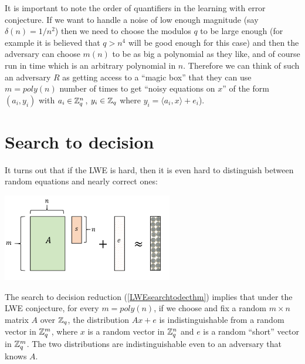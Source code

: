 It is important to note the order of quantifiers in the learning with
error conjecture. If we want to handle a noise of low enough magnitude
(say \(\delta(n) = 1/n^2\)) then we need to choose the modulos \(q\) to
be large enough (for example it is believed that \(q > n^4\) will be
good enough for this case) and then the adversary can choose \(m(n)\) to
be as big a polynomial as they like, and of course run in time which is
an arbitrary polynomial in \(n\). Therefore we can think of such an
adversary \(R\) as getting access to a ``magic box'' that they can use
\(m=poly(n)\) number of times to get ``noisy equations on \(x\)'' of the
form \((a_i,y_i)\) with \(a_i\in {\mathbb{Z}}_q^n\), \(y_i \in {\mathbb{Z}}_q\) where
\(y_i = \langle a_i, x \rangle + e_i\)).

\section{Search to decision}\label{Search-to-decision}

It turns out that if the LWE is hard, then it is even hard to
distinguish between random equations and nearly correct ones:


\begin{marginfigure}
\centering
\includegraphics[width=\linewidth, height=1.5in, keepaspectratio]{../figure/lwevecindist.png}
\caption{The search to decision reduction (\cref{LWEsearchtodecthm})
implies that under the LWE conjecture, for every \(m=poly(n)\), if we
choose and fix a random \(m\times n\) matrix \(A\) over \({\mathbb{Z}}_q\), the
distribution \(Ax+e\) is indistinguishable from a random vector in
\({\mathbb{Z}}_q^m\), where \(x\) is a random vector in \({\mathbb{Z}}_q^n\) and \(e\) is a
random ``short'' vector in \({\mathbb{Z}}_q^m\). The two distributions are
indistinguishable even to an adversary that knows \(A\).}
\label{figid}
\end{marginfigure}

